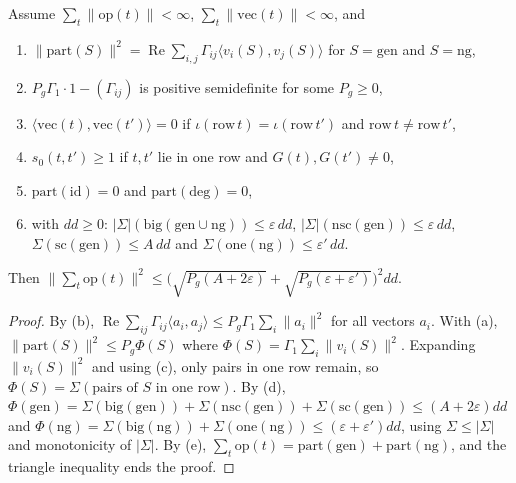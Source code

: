 \begin{theorem}\label{w2:pair}
Assume $\sum_t\lVert\mathrm{op}(t)\rVert<\infty$, $\sum_t\lVert\mathrm{vec}(t)\rVert<\infty$, and
\begin{enumerate}[label=(\alph*),leftmargin=*]
\item $\lVert\mathrm{part}(S)\rVert^2=\operatorname{Re}\sum_{i,j}\Gamma_{ij}\langle v_i(S),v_j(S)\rangle$ for $S=\mathrm{gen}$ and $S=\mathrm{ng}$,
\item $P_g\Gamma_1\cdot1-(\Gamma_{ij})$ is positive semidefinite for some $P_g\ge0$,
\item $\langle\mathrm{vec}(t),\mathrm{vec}(t')\rangle=0$ if $\iota(\mathrm{row}\,t)=\iota(\mathrm{row}\,t')$ and $\mathrm{row}\,t\ne\mathrm{row}\,t'$,
\item $s_0(t,t')\ge1$ if $t,t'$ lie in one row and $G(t),G(t')\ne0$,
\item $\mathrm{part}(\mathrm{id})=0$ and $\mathrm{part}(\mathrm{deg})=0$,
\item with $dd\ge0$: $\lvert\Sigma\rvert(\mathrm{big}(\mathrm{gen}\cup\mathrm{ng}))\le\varepsilon\,dd$, $\lvert\Sigma\rvert(\mathrm{nsc}(\mathrm{gen}))\le\varepsilon\,dd$, $\Sigma(\mathrm{sc}(\mathrm{gen}))\le A\,dd$ and $\Sigma(\mathrm{one}(\mathrm{ng}))\le\varepsilon'\,dd$.
\end{enumerate}
Then $\lVert\sum_t\mathrm{op}(t)\rVert^2\le\bigl(\sqrt{P_g(A+2\varepsilon)}+\sqrt{P_g(\varepsilon+\varepsilon')}\bigr)^2dd$.
\end{theorem}

\begin{proof}
By (b), $\operatorname{Re}\sum_{ij}\Gamma_{ij}\langle a_i,a_j\rangle\le P_g\Gamma_1\sum_i\lVert a_i\rVert^2$ for all vectors $a_i$. With (a), $\lVert\mathrm{part}(S)\rVert^2\le P_g\Phi(S)$ where $\Phi(S)=\Gamma_1\sum_i\lVert v_i(S)\rVert^2$. Expanding $\lVert v_i(S)\rVert^2$ and using (c), only pairs in one row remain, so $\Phi(S)=\Sigma(\text{pairs of }S\text{ in one row})$. By (d), $\Phi(\mathrm{gen})=\Sigma(\mathrm{big}(\mathrm{gen}))+\Sigma(\mathrm{nsc}(\mathrm{gen}))+\Sigma(\mathrm{sc}(\mathrm{gen}))\le(A+2\varepsilon)dd$ and $\Phi(\mathrm{ng})=\Sigma(\mathrm{big}(\mathrm{ng}))+\Sigma(\mathrm{one}(\mathrm{ng}))\le(\varepsilon+\varepsilon')dd$, using $\Sigma\le\lvert\Sigma\rvert$ and monotonicity of $\lvert\Sigma\rvert$. By (e), $\sum_t\mathrm{op}(t)=\mathrm{part}(\mathrm{gen})+\mathrm{part}(\mathrm{ng})$, and the triangle inequality ends the proof.
\end{proof}

